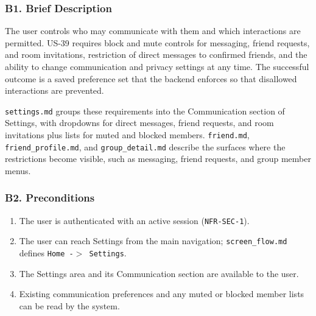 \documentclass[12pt]{article}
\begin{document}
\hypertarget{sec:b1-brief-description}{}
\subsubsection*{B1. Brief Description}
\par\medskip

The user controls who may communicate with them and which interactions are permitted. US-39 requires block and mute controls for messaging, friend requests, and room invitations, restriction of direct messages to confirmed friends, and the ability to change communication and privacy settings at any time. The successful outcome is a saved preference set that the backend enforces so that disallowed interactions are prevented.
\par\medskip

\texttt{settings.md} groups these requirements into the Communication section of Settings, with dropdowns for direct messages, friend requests, and room invitations plus lists for muted and blocked members. \texttt{friend.md}, \texttt{friend\_profile.md}, and \texttt{group\_detail.md} describe the surfaces where the restrictions become visible, such as messaging, friend requests, and group member menus.
\par\medskip

\hypertarget{sec:b2-preconditions}{}
\subsubsection*{B2. Preconditions}
\par\medskip

\begin{enumerate}
\item The user is authenticated with an active session (\texttt{NFR-SEC-1}).
\item The user can reach Settings from the main navigation; \texttt{screen\_flow.md} defines \texttt{Home -$>$ Settings}.
\item The Settings area and its Communication section are available to the user.
\item Existing communication preferences and any muted or blocked member lists can be read by the system.
\end{enumerate}
\par\medskip

\hypertarget{sec:b3-postconditions}{}
\end{document}
